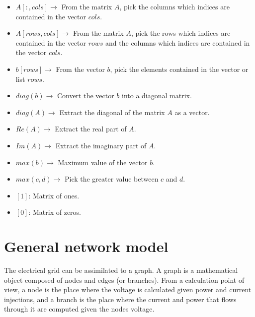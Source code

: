 \documentclass[nols,a4paper,twoside,notoc,fleqn]{tufte-book}
\begin{document}
\begin{fullwidth}
\begin{multicols}{2}
\begin{itemize}
	
	\item $A[:, cols] \rightarrow$ From the matrix $A$, pick the columns which indices are contained in the vector  $cols$.
	
	
	\item $A[rows, cols] \rightarrow$ From the matrix $A$, pick the rows which indices are contained in the vector  $rows$ and the columns which indices are contained in the vector  $cols$.
	
	
	\item $b[rows] \rightarrow$ From the vector $b$, pick the elements contained in the vector or list $rows$.
	
	\item $diag(b) \rightarrow$ Convert the vector $b$ into a diagonal matrix. 
	
	\item $diag(A) \rightarrow$ Extract the diagonal of the matrix $A$ as a vector. 
	
	\item $Re(A) \rightarrow$ Extract the real part of $A$.
	
	\item $Im(A) \rightarrow$ Extract the imaginary part of $A$.
	
	\item $max(b) \rightarrow$ Maximum value of the vector $b$.
	
	\item $max(c, d) \rightarrow$ Pick the greater value between $c$ and $d$.
	
	\item $[1]$: Matrix of ones.

	\item $[0]$: Matrix of zeros.
\end{itemize}

\end{multicols}

\end{fullwidth}

\chapter{General network model}

The electrical grid can be assimilated to a graph. A graph is a mathematical object composed of nodes and edges (or branches). From a calculation point of view, a node is the place where the voltage is calculated given power and current injections, and a branch is the place where the current and power that flows through it are computed given the nodes voltage.
\end{document}
